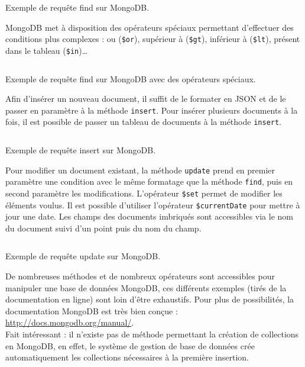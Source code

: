   \begin{listing}[H]
    \inputminted{json}{code/requeteMongoFind.json}
    \caption{Exemple de requête find sur MongoDB.}
  \end{listing}

  MongoDB met à disposition des opérateurs spéciaux permettant d'effectuer des conditions plus complexes : ou (\verb|$or|), supérieur à (\verb|$gt|), inférieur à (\verb|$lt|), présent dans le tableau (\verb|$in|)\dots

  \begin{listing}[H]
    \inputminted{json}{code/requeteMongoFindOperator.json}
    \caption{Exemple de requête find sur MongoDB avec des opérateurs spéciaux.}
  \end{listing}

  Afin d'insérer un nouveau document, il suffit de le formater en JSON et de le passer en paramètre à la méthode \verb|insert|. Pour insérer plusieurs documents à la fois, il est possible de passer un tableau de documents à la méthode \verb|insert|.

  \begin{listing}[H]
    \inputminted{json}{code/requeteMongoInsert.json}
    \caption{Exemple de requête insert sur MongoDB.}
  \end{listing}

  Pour modifier un document existant, la méthode \verb|update| prend en premier paramètre une condition avec le même formatage que la méthode \verb|find|, puis en second paramètre les modifications. L'opérateur \verb|$set| permet de modifier les éléments voulus. Il est possible d'utiliser l'opérateur \verb|$currentDate| pour mettre à jour une date. Les champs des documents imbriqués sont accessibles via le nom du document suivi d'un point puis du nom du champ. 

  \begin{listing}[H]
    \inputminted{json}{code/requeteMongoUpdate.json}
    \caption{Exemple de requête update sur MongoDB.}
  \end{listing}

  De nombreuses méthodes et de nombreux opérateurs sont accessibles pour manipuler une base de données MongoDB, ces différents exemples (tirés de la documentation en ligne) sont loin d'être exhaustifs. Pour plus de possibilités, la documentation MongoDB est très bien conçue : \url{http://docs.mongodb.org/manual/}.\\

  Fait intéressant : il n'existe pas de méthode permettant la création de collections en MongoDB, en effet, le système de gestion de base de données crée automatiquement les collections nécessaires à la première insertion.

